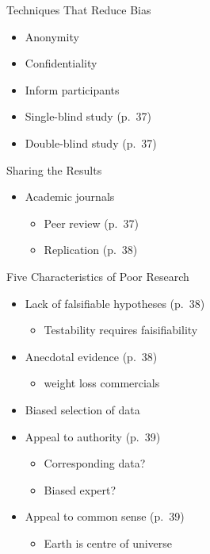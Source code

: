 \documentclass[
]{book}
\providecommand{\tightlist}{%
  \setlength{\itemsep}{0pt}\setlength{\parskip}{0pt}}
\begin{document}
Techniques That Reduce Bias

\begin{itemize}
\tightlist
\item
  Anonymity\\
\item
  Confidentiality\\
\item
  Inform participants\\
\item
  Single-blind study (p.~37)\\
\item
  Double-blind study (p.~37)
\end{itemize}

Sharing the Results

\begin{itemize}
\tightlist
\item
  Academic journals

  \begin{itemize}
  \tightlist
  \item
    Peer review (p.~37)\\
  \item
    Replication (p.~38)
  \end{itemize}
\end{itemize}

Five Characteristics of Poor Research

\begin{itemize}
\tightlist
\item
  Lack of falsifiable hypotheses (p.~38)

  \begin{itemize}
  \tightlist
  \item
    Testability requires faisifiability\\
  \end{itemize}
\item
  Anecdotal evidence (p.~38)

  \begin{itemize}
  \tightlist
  \item
    weight loss commercials\\
  \end{itemize}
\item
  Biased selection of data\\
\item
  Appeal to authority (p.~39)

  \begin{itemize}
  \tightlist
  \item
    Corresponding data?\\
  \item
    Biased expert?\\
  \end{itemize}
\item
  Appeal to common sense (p.~39)

  \begin{itemize}
  \tightlist
  \item
    Earth is centre of universe
  \end{itemize}
\end{itemize}
\end{document}
